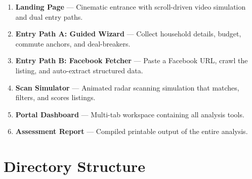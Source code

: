 \documentclass[12pt, a4paper, oneside]{report}
\begin{document}
\begin{enumerate}[leftmargin=2em]
  \item \textbf{Landing Page} --- Cinematic entrance with scroll-driven video simulation and dual entry paths.
  \item \textbf{Entry Path A: Guided Wizard} --- Collect household details, budget, commute anchors, and deal-breakers.
  \item \textbf{Entry Path B: Facebook Fetcher} --- Paste a Facebook URL, crawl the listing, and auto-extract structured data.
  \item \textbf{Scan Simulator} --- Animated radar scanning simulation that matches, filters, and scores listings.
  \item \textbf{Portal Dashboard} --- Multi-tab workspace containing all analysis tools.
  \item \textbf{Assessment Report} --- Compiled printable output of the entire analysis.
\end{enumerate}

\section{Directory Structure}
\end{document}
